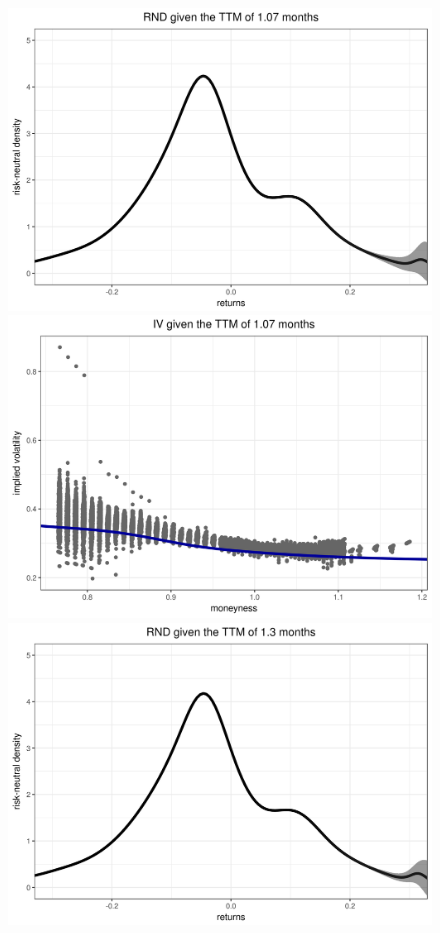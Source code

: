 \documentclass[a4paper,12pt]{article}
\theoremstyle{plain}
\theoremstyle{definition}
\begin{document}
\begin{figure}[H]
\begin{center}
 \includegraphics[width=\linewidth]{figures/hour_7th/GOOG_20150105_rnd_ci_7th_hour_ttm_1_07.png}
 \endminipage
 \hspace{3mm}
 \includegraphics[width=\linewidth]{figures/hour_7th/GOOG_20150105_iv_smile_7th_hour_ttm_1_07.png}
 \endminipage\\
 \includegraphics[width=\linewidth]{figures/hour_7th/GOOG_20150105_rnd_ci_7th_hour_ttm_1_3.png}

\end{center}
\end{figure}
\end{document}
